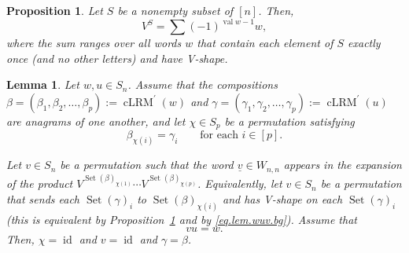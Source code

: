 \documentclass[10pt,a4paper]{amsart}
\newtheorem{proposition}{Proposition}
\newtheorem{lem}{Lemma}
\newcommand{\id}{\operatorname{id}} %
\begin{document}
\begin{proposition}
\label{prop.dynkin.Vsh}
Let $S$ be a nonempty subset of $\left[  n\right]  $.
Then,
\[
V^{S}=\sum\left(  -1\right)  ^{\operatorname*{val}w-1}w,
\]
where the sum ranges over all words $w$ that contain each element of $S$ exactly
once (and no other letters) and have V-shape.
\end{proposition}

\begin{lem}
\label{lem.wuv}Let $w,u\in S_{n}$. Assume that the compositions $\beta=\left(
\beta_{1},\beta_{2},\ldots,\beta_{p}\right)  :=\operatorname{cLRM}^{\prime
}(w)$ and $\gamma=\left(  \gamma_{1},\gamma_{2},\ldots,\gamma_{p}\right)
:=\operatorname{cLRM}^{\prime}(u)$ are anagrams of one another, and let
$\chi\in S_{p}$ be a permutation satisfying%
\begin{equation}
\beta_{\chi\left(  i\right)  }=\gamma_{i}\qquad\text{for each }i\in\left[
p\right]  .
\label{eq.lem.wuv.bg}
\end{equation}

Let $v\in S_{n}$ be a permutation such that the word $\underline{v}\in
W_{n,n}$ appears in the expansion of the product $V^{\operatorname{Set}%
(\beta)_{\chi(1)}}\cdots V^{\operatorname{Set}(\beta)_{\chi(p)}}$.
Equivalently, let
$v\in S_{n}$ be a permutation that sends each $\operatorname*{Set}\left(
\gamma\right)  _{i}$ to $\operatorname*{Set}\left(  \beta\right)
_{\chi\left(  i\right)  }$ and has V-shape on each $\operatorname*{Set}\left(
\gamma\right)  _{i}$
(this is equivalent by Proposition~\ref{prop.dynkin.Vsh} and by
\eqref{eq.lem.wuv.bg}). Assume that
\[
vu=w.
\]
Then, $\chi= \id $ and $v= \id $ and $\gamma=\beta$.
\end{lem}
\end{document}
